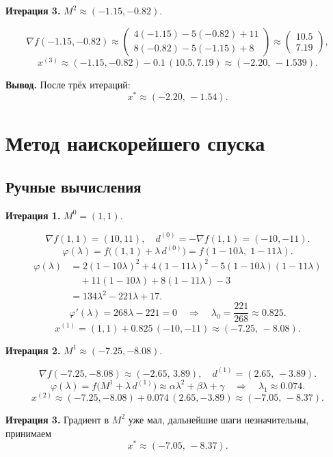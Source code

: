 \documentclass{article}
\begin{document}
\medskip
\textbf{Итерация 3.} $M^2\approx(-1.15,-0.82)$.

\[
\nabla f(-1.15,-0.82)\approx
\begin{pmatrix}
4(-1.15)-5(-0.82)+11\\
8(-0.82)-5(-1.15)+8
\end{pmatrix}
\approx
\begin{pmatrix}
10.5\\
7.19
\end{pmatrix},
\]
\[
x^{(3)}\approx(-1.15,-0.82)-0.1\,(10.5,7.19)\approx(-2.20,\,-1.539).
\]

\medskip
\textbf{Вывод.} После трёх итераций:
\[
x^*\approx(-2.20,\,-1.54).
\]

\section{Метод наискорейшего спуска}
\subsection{Ручные вычисления}

\textbf{Итерация 1.} $M^0=(1,1)$.

\[
\nabla f(1,1)=(10,11),\quad
d^{(0)}=-\nabla f(1,1)=(-10,-11).
\]
\[
\varphi(\lambda)=f\bigl((1,1)+\lambda\,d^{(0)}\bigr)
=f(1-10\lambda,\;1-11\lambda).
\]
\begin{align*}
\varphi(\lambda)&=
2(1-10\lambda)^2+4(1-11\lambda)^2-5(1-10\lambda)(1-11\lambda)\\
&\quad+11(1-10\lambda)+8(1-11\lambda)-3\\
&=134\lambda^2-221\lambda+17.
\end{align*}
\[
\varphi'(\lambda)=268\lambda-221=0
\quad\Longrightarrow\quad
\lambda_0=\frac{221}{268}\approx0.825.
\]
\[
x^{(1)}=(1,1)+0.825\,(-10,-11)\approx(-7.25,\,-8.08).
\]

\medskip
\textbf{Итерация 2.} $M^1\approx(-7.25,-8.08)$.

\[
\nabla f(-7.25,-8.08)\approx(-2.65,\,3.89),\quad
d^{(1)}=(2.65,\,-3.89).
\]
\[
\varphi(\lambda)=f\bigl(M^1+\lambda\,d^{(1)}\bigr)
\approx  \alpha\lambda^2+\beta\lambda+\gamma
\quad\Longrightarrow\quad
\lambda_1\approx0.074.
\]
\[
x^{(2)}\approx(-7.25,-8.08)+0.074\,(2.65,-3.89)\approx(-7.05,\,-8.37).
\]

\medskip
\textbf{Итерация 3.} Градиент в $M^2$ уже мал, дальнейшие шаги незначительны, принимаем
\[
x^*\approx(-7.05,\,-8.37).
\]
\end{document}
